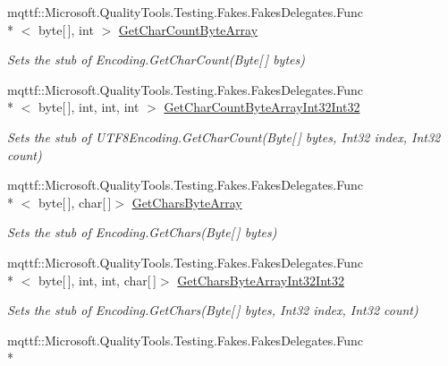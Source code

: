 \begin{DoxyCompactItemize}
mqttf\-::\-Microsoft.\-Quality\-Tools.\-Testing.\-Fakes.\-Fakes\-Delegates.\-Func\\*
$<$ byte\mbox{[}$\,$\mbox{]}, int $>$ \hyperlink{class_system_1_1_text_1_1_fakes_1_1_stub_u_t_f8_encoding_a33f20dc66d826ed222df97d950d79c1f}{Get\-Char\-Count\-Byte\-Array}
\begin{DoxyCompactList}\small\item\em Sets the stub of Encoding.\-Get\-Char\-Count(\-Byte\mbox{[}$\,$\mbox{]} bytes)\end{DoxyCompactList}\item 
mqttf\-::\-Microsoft.\-Quality\-Tools.\-Testing.\-Fakes.\-Fakes\-Delegates.\-Func\\*
$<$ byte\mbox{[}$\,$\mbox{]}, int, int, int $>$ \hyperlink{class_system_1_1_text_1_1_fakes_1_1_stub_u_t_f8_encoding_aeb79dad2d5d1ab252091e75da9c1c505}{Get\-Char\-Count\-Byte\-Array\-Int32\-Int32}
\begin{DoxyCompactList}\small\item\em Sets the stub of U\-T\-F8\-Encoding.\-Get\-Char\-Count(\-Byte\mbox{[}$\,$\mbox{]} bytes, Int32 index, Int32 count)\end{DoxyCompactList}\item 
mqttf\-::\-Microsoft.\-Quality\-Tools.\-Testing.\-Fakes.\-Fakes\-Delegates.\-Func\\*
$<$ byte\mbox{[}$\,$\mbox{]}, char\mbox{[}$\,$\mbox{]}$>$ \hyperlink{class_system_1_1_text_1_1_fakes_1_1_stub_u_t_f8_encoding_ae92ce745c1c82627c8b21b8e6b728054}{Get\-Chars\-Byte\-Array}
\begin{DoxyCompactList}\small\item\em Sets the stub of Encoding.\-Get\-Chars(\-Byte\mbox{[}$\,$\mbox{]} bytes)\end{DoxyCompactList}\item 
mqttf\-::\-Microsoft.\-Quality\-Tools.\-Testing.\-Fakes.\-Fakes\-Delegates.\-Func\\*
$<$ byte\mbox{[}$\,$\mbox{]}, int, int, char\mbox{[}$\,$\mbox{]}$>$ \hyperlink{class_system_1_1_text_1_1_fakes_1_1_stub_u_t_f8_encoding_a0feee626b70dd71e8d37b52ce0b017c1}{Get\-Chars\-Byte\-Array\-Int32\-Int32}
\begin{DoxyCompactList}\small\item\em Sets the stub of Encoding.\-Get\-Chars(\-Byte\mbox{[}$\,$\mbox{]} bytes, Int32 index, Int32 count)\end{DoxyCompactList}\item 
mqttf\-::\-Microsoft.\-Quality\-Tools.\-Testing.\-Fakes.\-Fakes\-Delegates.\-Func\\*

\end{DoxyCompactItemize}
